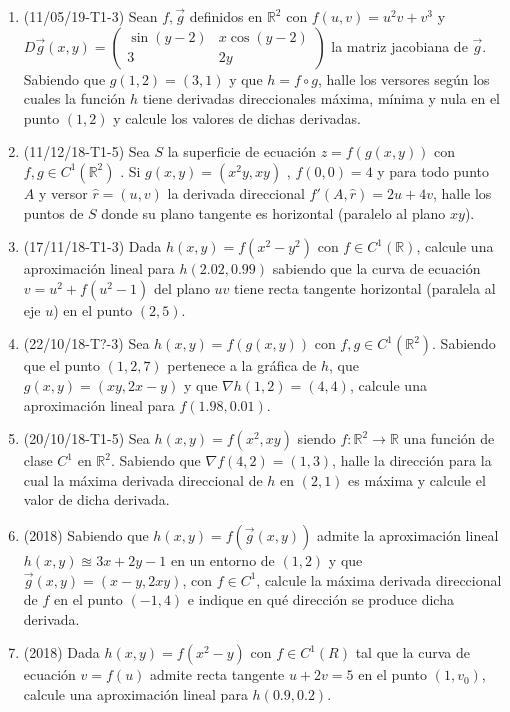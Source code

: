 \documentclass[12pt,a4paper]{article}
\newcommand{\R}{\mathbb{R}}
\begin{document}
\begin{enumerate}
	\item (11/05/19-T1-3) Sean $f , \vec{g}$ definidos en $\R^2$ con $f ( u , v ) = u^2 v + v^3$ y $D\vec{g} ( x , y ) = \left(\begin{matrix}
	\sin(y-2) & x\cos(y-2)\\
	3 & 2y
	\end{matrix}\right)$ la matriz jacobiana de $\vec{g}$. Sabiendo que $ g ( 1 , 2 ) = ( 3 , 1 ) $ y que $h = f \circ g $, halle los versores según los cuales la
	función $h$ tiene derivadas direccionales máxima, mínima y nula en el punto $( 1 , 2 )$ y calcule los valores de dichas derivadas.
	
	\item (11/12/18-T1-5) Sea $S$ la superficie de ecuación $z = f ( g ( x , y ))$ con $f , g \in C^1 (\R^2 )$ . Si $g ( x , y ) = ( x^2 y , x y )$ , $f ( 0 , 0 ) = 4$ y para todo punto $A$ y versor $\hat{r} = ( u , v )$ la derivada direccional $f'( A , \hat{r} ) = 2 u + 4 v$,	halle los puntos de $S$ donde su plano tangente es horizontal (paralelo al plano $xy $).
	
	\item (17/11/18-T1-3) Dada $h ( x , y ) = f ( x^2 - y^2 )$ con $f\in C^1 (\R)$, calcule una aproximación lineal para $h ( 2 . 02 , 0 . 99 )$ sabiendo que la curva de ecuación $v = u^2 + f ( u^2 - 1 )$ del plano $uv$ tiene recta tangente horizontal (paralela al eje $u $) en el punto $( 2 , 5 ) $.
	
	\item (22/10/18-T?-3) Sea $h ( x , y ) = f ( g ( x , y ))$ con $f , g \in C^1 (\R^2) $. Sabiendo que el punto $( 1 , 2 , 7 )$ pertenece a la gráfica de $h$, que $g ( x , y ) = ( x y , 2 x - y )$ y que $\nabla h ( 1 , 2 ) = ( 4 , 4 )$, calcule una aproximación lineal para $f ( 1 . 98 , 0 . 01 ) $.
	
	\item (20/10/18-T1-5) Sea $h ( x , y ) = f ( x^2 , x y )$ siendo $f : \R^2 \rightarrow \R$ una función de clase $C^1$ en $\R^2$. Sabiendo que $\nabla f ( 4 , 2 ) = ( 1 , 3 ) $, halle la dirección para la cual la máxima derivada direccional de $h$ en $( 2 , 1 )$ es máxima y calcule el valor de dicha derivada.
	
	\item (2018) Sabiendo que $h(x, y) = f(\vec{g} (x, y))$ admite la aproximación lineal $h(x, y) \approxeq 3 x + 2 y - 1$ en	un entorno de $(1, 2)$ y que $\vec{g} (x, y) = (x - y , 2 x y )$, con $f \in C^1 $, calcule la máxima derivada direccional de $f$ en el punto $(-1, 4)$ e indique en qué dirección se produce dicha derivada.
	
	\item (2018) Dada $h(x, y) = f(x^2 - y)$ con $f \in C^1 (R)$ tal que la curva de ecuación $v = f(u)$ admite recta tangente $u + 2 v = 5$ en el punto $(1, v_0 )$, calcule una aproximación lineal para $h(0.9, 0.2)$.
\end{enumerate}
\end{document}
